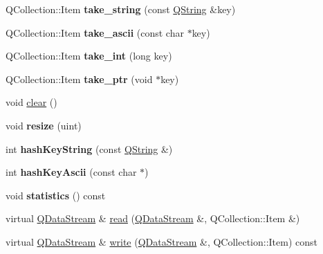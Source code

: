 \begin{DoxyCompactItemize}
\item 
\hypertarget{class_q_g_dict_afd5766efec3b442000c295d7786e4068}{Q\-Collection\-::\-Item {\bfseries take\-\_\-string} (const \hyperlink{class_q_string}{Q\-String} \&key)}\label{class_q_g_dict_afd5766efec3b442000c295d7786e4068}

\item 
\hypertarget{class_q_g_dict_adb2d59f9c1752a9af133f9b6392995d9}{Q\-Collection\-::\-Item {\bfseries take\-\_\-ascii} (const char $\ast$key)}\label{class_q_g_dict_adb2d59f9c1752a9af133f9b6392995d9}

\item 
\hypertarget{class_q_g_dict_ab11dc2d302437a8798860cc0aa4f5661}{Q\-Collection\-::\-Item {\bfseries take\-\_\-int} (long key)}\label{class_q_g_dict_ab11dc2d302437a8798860cc0aa4f5661}

\item 
\hypertarget{class_q_g_dict_a0bd2665cbc1f536408324234e7febdcc}{Q\-Collection\-::\-Item {\bfseries take\-\_\-ptr} (void $\ast$key)}\label{class_q_g_dict_a0bd2665cbc1f536408324234e7febdcc}

\item 
void \hyperlink{class_q_g_dict_ac8bb3912a3ce86b15842e79d0b421204}{clear} ()
\item 
\hypertarget{class_q_g_dict_acf2913c08262cc6b6e5485ac137312d9}{void {\bfseries resize} (uint)}\label{class_q_g_dict_acf2913c08262cc6b6e5485ac137312d9}

\item 
\hypertarget{class_q_g_dict_a572329914294c0811058ac6616c77274}{int {\bfseries hash\-Key\-String} (const \hyperlink{class_q_string}{Q\-String} \&)}\label{class_q_g_dict_a572329914294c0811058ac6616c77274}

\item 
\hypertarget{class_q_g_dict_a83aedc0380caa97cb2e52b772a8adbaa}{int {\bfseries hash\-Key\-Ascii} (const char $\ast$)}\label{class_q_g_dict_a83aedc0380caa97cb2e52b772a8adbaa}

\item 
\hypertarget{class_q_g_dict_a2b624ae0c69f64a3f0cb59d8ac80e365}{void {\bfseries statistics} () const }\label{class_q_g_dict_a2b624ae0c69f64a3f0cb59d8ac80e365}

\item 
virtual \hyperlink{class_q_data_stream}{Q\-Data\-Stream} \& \hyperlink{class_q_g_dict_a0c0d849cb524232b008db07c0c8d5b7b}{read} (\hyperlink{class_q_data_stream}{Q\-Data\-Stream} \&, Q\-Collection\-::\-Item \&)
\item 
virtual \hyperlink{class_q_data_stream}{Q\-Data\-Stream} \& \hyperlink{class_q_g_dict_a4a129683a3487b947f59307cb61d2b82}{write} (\hyperlink{class_q_data_stream}{Q\-Data\-Stream} \&, Q\-Collection\-::\-Item) const 
\end{DoxyCompactItemize}
